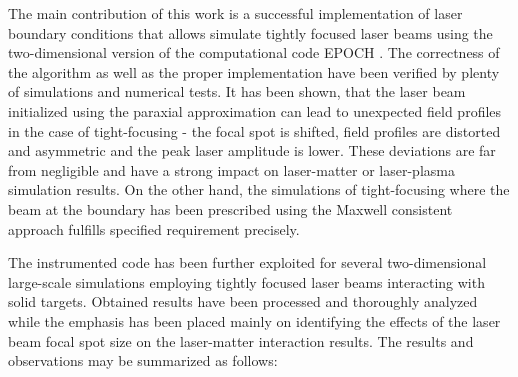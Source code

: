 The main contribution of this work is a successful implementation of laser boundary conditions that allows simulate tightly focused laser beams using the two-dimensional version of the computational code EPOCH \cite{bennett}. The correctness of the algorithm as well as the proper implementation have been verified by plenty of simulations and numerical tests. It has been shown, that the laser beam initialized using the paraxial approximation can lead to unexpected field profiles in the case of tight-focusing - the focal spot is shifted, field profiles are distorted and asymmetric and the peak laser amplitude is lower. These deviations are far from negligible and have a strong impact on laser-matter or laser-plasma simulation results. On the other hand, the simulations of tight-focusing where the beam at the boundary has been prescribed using the Maxwell consistent approach \cite{Thiele2016} fulfills specified requirement precisely.

The instrumented code has been further exploited for several two-dimensional large-scale simulations employing tightly focused laser beams interacting with solid targets. Obtained results have been processed and thoroughly analyzed while the emphasis has been placed mainly on identifying the effects of the laser beam focal spot size on the laser-matter interaction results. The results and observations may be summarized as follows:

